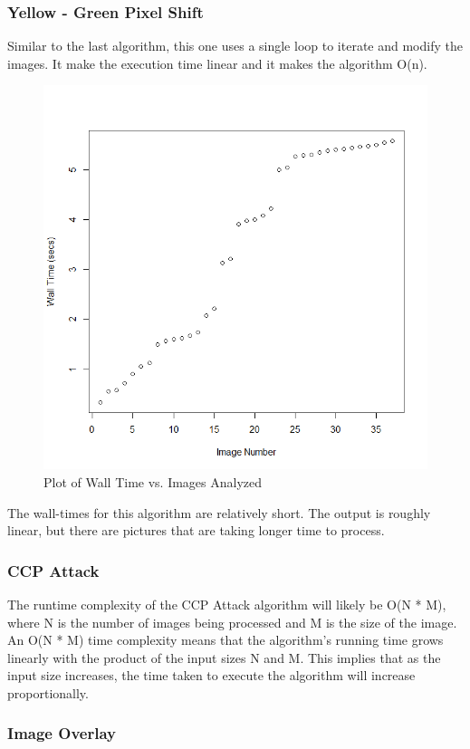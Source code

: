 \documentclass{article}
\begin{document}
\subsubsection{Yellow - Green Pixel Shift}
Similar to the last algorithm, this one uses a single loop to iterate and modify the images. It make the execution time linear and it makes the algorithm O(n). 
\begin{figure}[H]
\centering
\includegraphics[scale = 0.4]{Walltime_shift_2.png}
    \caption{Plot of Wall Time vs. Images Analyzed}
    \label{fig:my_label}
\end{figure}
The wall-times for this algorithm are relatively short. The output is roughly linear, but there are pictures that are taking longer time to process.
\subsubsection{CCP Attack}
The runtime complexity of the CCP Attack algorithm will likely be O(N * M), where N is the number of images being processed and M is the size of the image. An O(N * M) time complexity means that the algorithm's running time grows linearly with the product of the input sizes N and M. This implies that as the input size increases, the time taken to execute the algorithm will increase proportionally. 
\subsubsection{Image Overlay}
\end{document}
